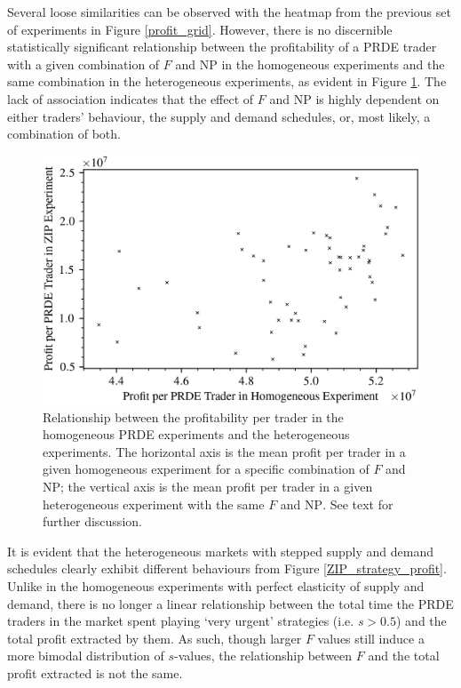 \documentclass[conference]{IEEEtran}
\begin{document}
Several loose similarities can be observed with the heatmap from the previous set of experiments in Figure \ref{profit_grid}.
However, there is no discernible statistically significant relationship between the profitability of a PRDE trader with a given combination of $F$ and $\mathrm{NP}$ in the homogeneous experiments and the same combination in the heterogeneous experiments, as evident in Figure \ref{homo_zip_scatter}.
The lack of association indicates that the effect of $F$ and $\mathrm{NP}$ is highly dependent on either traders' behaviour, the supply and demand schedules, or, most likely, a combination of both.

\begin{figure}[htbp]
    \centerline{\includegraphics[width=\columnwidth]{homo_zip_scatter.png}}
    \caption{
        Relationship between the profitability per trader in the homogeneous PRDE experiments and the heterogeneous experiments.
        The horizontal axis is the mean profit per trader in a given homogeneous experiment for a specific combination of $F$ and $\mathrm{NP}$; the vertical axis is the mean profit per trader in a given heterogeneous experiment with the same $F$ and $\mathrm{NP}$.
        See text for further discussion.
    }
    \label{homo_zip_scatter}
\end{figure}

It is evident that the heterogeneous markets with stepped supply and demand schedules clearly exhibit different behaviours from Figure \ref{ZIP_strategy_profit}.
Unlike in the homogeneous experiments with perfect elasticity of supply and demand, there is no longer a linear relationship between the total time the PRDE traders in the market spent playing `very urgent' strategies (i.e. $s>0.5$) and the total profit extracted by them.
As such, though larger $F$ values still induce a more bimodal distribution of $s$-values, the relationship between $F$ and the total profit extracted is not the same.
\end{document}
